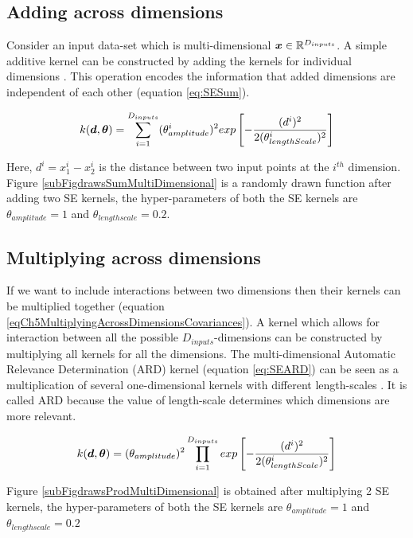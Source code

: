 \subsection{Adding across dimensions}
Consider an input data-set which is multi-dimensional $\boldsymbol{x} \in \mathbb{R}^{D_{inputs}}$. A simple additive kernel can be constructed by adding the kernels for individual dimensions \cite{hastie1990generalized}. This operation encodes the information that added dimensions are independent of each other (equation \ref{eq:SESum}). 

\begin{equation}\label{eq:SESum}
k(\boldsymbol{d}, \boldsymbol{\theta}) = \sum_{i=1}^{D_{inputs}} (\theta_{amplitude}^{i})^2 exp\left [ -\frac{(d^{i})^2}{2(\theta_{lengthScale}^{i})^2} \right ]
\end{equation}

Here, $d^{i} = x^{i}_{1} - x^{i}_{2}$ is the distance between two input points at the $i^{th}$ dimension. Figure \ref{subFigdrawsSumMultiDimensional} is a randomly drawn function after adding two SE kernels, the hyper-parameters of both the SE kernels are $\theta_{amplitude}=1$ and $\theta_{lengthscale}=0.2$. 

\subsection{Multiplying across dimensions}
If we want to include interactions between two dimensions then their kernels can be multiplied together (equation \ref{eqCh5MultiplyingAcrossDimensionsCovariances}). A kernel which allows for interaction between all the possible $D_{inputs}$-dimensions can be constructed by multiplying all kernels for all the dimensions. The multi-dimensional Automatic Relevance Determination (ARD) kernel (equation \ref{eq:SEARD}) can be seen as a multiplication of several one-dimensional kernels with different length-scales \cite{Rasmussen2005}. It is called ARD because the value of length-scale determines which dimensions are more relevant.

\begin{equation}\label{eq:SEARD}
k(\boldsymbol{d}, \boldsymbol{\theta}) = (\theta_{amplitude})^2 \prod_{i=1}^{D_{inputs}}  exp\left [ -\frac{(d^{i})^2}{2(\theta_{lengthScale}^{i})^2} \right ]
\end{equation}

Figure \ref{subFigdrawsProdMultiDimensional} is obtained after multiplying 2 SE kernels, the hyper-parameters of both the SE kernels are $\theta_{amplitude}=1$ and $\theta_{lengthscale}=0.2$ 

